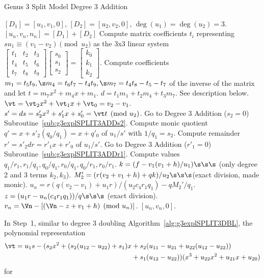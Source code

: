 \begin{algorithm}
\caption{Genus 3 Split Model Degree 3 Addition\label{alg:g3explSPLIT3ADD}}
\begin{algorithmic} [1]
\Require $[D_1]= [u_1, v_1,0]$, $[D_2]= [u_2, v_2,0]$, $\deg(u_1) = \deg(u_2) = 3$.
\Ensure $[u_n,v_n,n_n] = [D_1] + [D_2]$
\algrule
\State Compute matrix coefficients $t_i$ representing $su_1\equiv (v_1 - v_2) \pmod{u_2}$ as the 3x3 linear system $ \left[
\begin{smallmatrix} t_1 & t_2 & t_3\\ t_4 & t_5 & t_6\\ t_7 &t_8 & t_9 \end{smallmatrix}\right] \left[
\begin{smallmatrix} s_0\\ s_1 \\s_2 \end{smallmatrix} \right] = \left[ \begin{smallmatrix}k_0
\\  k_1 \\ k_2 \end{smallmatrix} \right]$.
\State Compute coefficients $m_1 = t_5t_9, \s m_4 = t_6t_7 - t_4t_9, \s m_7 = t_4t_8 - t_5-t_7$ of the inverse of the matrix and let $t = m_7x^2 + m_4x + m_1$.
\State $d = t_1m_1 + t_2m_4 + t_3m_7$.
\State See description below.
\EndIf
\State $\vt = \vt_2x^2 + \vt_1x + \vt_0 = v_2 - v_1$.
\State $s' = ds = s_2'x^2 + s_1'x + s_0' =  \vt t \pmod{u_2}$.
\State Go to Degree 3 Addition ($s_2=0$) Subroutine~\ref{sub:g3explSPLIT3ADDs2}.
\EndIf
\State Compute monic quotient $q'= x + s'_2(q_0/q_1) = x + q'_0$ of $u_1/s'$ with $1/q_1 = s_2$. 
\State Compute remainder $r' = s'_2dr = r'_1x + r'_0$ of $u_1/s'$.
\State Go to Degree 3 Addition ($r'_1=0$) Subroutine~\ref{sub:g3explSPLIT3ADDr1}.
\EndIf
\State Compute values $q_1/r_1, r_1/q_1, q_0/q_1, r_0/q_1, q_0/r_1, r_0/r_1$.
\State $k = (f - v_1(v_1 + h)/u_1) \s\s\s $ (only degree 2 and 3 terms $k_2,k_3$).
\State $M_2' = (r(v_2 + v_1 + h) + qk)/u_2 \s\s\s $(exact division, made monic).
\State $u_n = r(q(v_2 - v_1) + u_1r)/(u_2c_4r_1q_1) - qM_2'/q_1.$
\State $z = (u_1r - u_n(c_4r_1q_1))/q \s\s\s$ (exact division).
\State $v_n = \Vn - [(\Vn - z + v_1 + h) \pmod{u_n}]$.
\State \Return $[u_n,v_n,0]$.
\end{algorithmic}
\end{algorithm} In Step~1, similar to degree 3 doubling
Algorithm~\ref{alg:g3explSPLIT3DBL}, the polynomial representation \begin{align*}
    \vt = u_1s
- (s_2x^2 + (s_2(u_{12} - u_{22}) + s_1)x &+ s_2(u_{11} - u_{21} + u_{22}(u_{12}
- u_{22})) \\
        &+ s_1(u_{12} - u_{22}))(x^3 + u_{22}x^2 + u_{21}x + u_{20})
\end{align*} for
